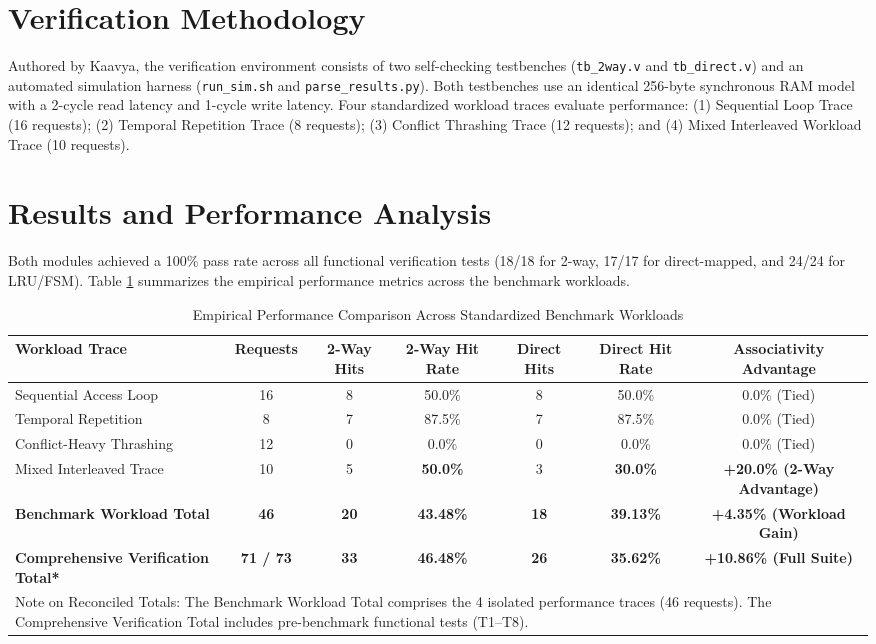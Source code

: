 \documentclass[10pt,twocolumn]{article}
\begin{document}
\section{Verification Methodology}
Authored by Kaavya, the verification environment consists of two self-checking testbenches (\texttt{tb\_2way.v} and \texttt{tb\_direct.v}) and an automated simulation harness (\texttt{run\_sim.sh} and \texttt{parse\_results.py}). Both testbenches use an identical 256-byte synchronous RAM model with a 2-cycle read latency and 1-cycle write latency. Four standardized workload traces evaluate performance: (1) Sequential Loop Trace (16 requests); (2) Temporal Repetition Trace (8 requests); (3) Conflict Thrashing Trace (12 requests); and (4) Mixed Interleaved Workload Trace (10 requests).

\section{Results and Performance Analysis}
Both modules achieved a 100\% pass rate across all functional verification tests (18/18 for 2-way, 17/17 for direct-mapped, and 24/24 for LRU/FSM). Table \ref{tab:results} summarizes the empirical performance metrics across the benchmark workloads.

\begin{table}[htbp]
\caption{Empirical Performance Comparison Across Standardized Benchmark Workloads}
\label{tab:results}
\centering
\small
\begin{tabular}{lcccccc}
\toprule
\textbf{Workload Trace} & \textbf{Requests} & \textbf{2-Way Hits} & \textbf{2-Way Hit Rate} & \textbf{Direct Hits} & \textbf{Direct Hit Rate} & \textbf{Associativity Advantage} \\
\midrule
Sequential Access Loop & 16 & 8 & 50.0\% & 8 & 50.0\% & 0.0\% (Tied) \\
Temporal Repetition & 8 & 7 & 87.5\% & 7 & 87.5\% & 0.0\% (Tied) \\
Conflict-Heavy Thrashing & 12 & 0 & 0.0\% & 0 & 0.0\% & 0.0\% (Tied) \\
Mixed Interleaved Trace & 10 & 5 & \textbf{50.0\%} & 3 & \textbf{30.0\%} & \textbf{+20.0\% (2-Way Advantage)} \\
\midrule
\textbf{Benchmark Workload Total} & \textbf{46} & \textbf{20} & \textbf{43.48\%} & \textbf{18} & \textbf{39.13\%} & \textbf{+4.35\% (Workload Gain)} \\
\textbf{Comprehensive Verification Total*} & \textbf{71 / 73} & \textbf{33} & \textbf{46.48\%} & \textbf{26} & \textbf{35.62\%} & \textbf{+10.86\% (Full Suite)} \\
\bottomrule
\multicolumn{7}{l}{\footnotesize *Note on Reconciled Totals: The Benchmark Workload Total comprises the 4 isolated performance traces (46 requests). The Comprehensive Verification Total includes pre-benchmark functional tests (T1--T8).}
\end{tabular}
\end{table}
\end{document}
